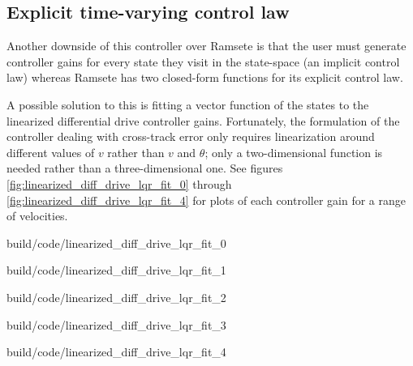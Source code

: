 \subsection{Explicit time-varying control law}

Another downside of this controller over Ramsete is that the user must generate
controller gains for every state they visit in the state-space (an implicit
control law) whereas Ramsete has two closed-form functions for its explicit
control law.

A possible solution to this is fitting a vector function of the states to the
linearized differential drive controller gains. Fortunately, the formulation of
the controller dealing with cross-track error only requires linearization around
different values of $v$ rather than $v$ and $\theta$; only a two-dimensional
function is needed rather than a three-dimensional one. See figures
\ref{fig:linearized_diff_drive_lqr_fit_0} through
\ref{fig:linearized_diff_drive_lqr_fit_4} for plots of each controller gain for
a range of velocities.

\begin{bookfigure}
  \begin{minisvg}{build/code/linearized_diff_drive_lqr_fit_0}
    \caption{Linearized differential drive controller LQR gain regression fit
      ($x$)}
    \label{fig:linearized_diff_drive_lqr_fit_0}
  \end{minisvg}
  \hfill
  \begin{minisvg}{build/code/linearized_diff_drive_lqr_fit_1}
    \caption{Linearized differential drive controller LQR gain fit regression
      fit ($y$)}
    \label{fig:linearized_diff_drive_lqr_fit_1}
  \end{minisvg}
  \hfill
  \begin{minisvg}{build/code/linearized_diff_drive_lqr_fit_2}
    \caption{Linearized differential drive controller LQR gain regression fit
      ($\theta$)}
    \label{fig:linearized_diff_drive_lqr_fit_2}
  \end{minisvg}
  \hfill
  \begin{minisvg}{build/code/linearized_diff_drive_lqr_fit_3}
    \caption{Linearized differential drive controller LQR gain regression fit
      ($v_l$)}
    \label{fig:linearized_diff_drive_lqr_fit_3}
  \end{minisvg}
  \hfill
  \begin{minisvg}{build/code/linearized_diff_drive_lqr_fit_4}
    \caption{Linearized differential drive controller LQR gain regression fit
      ($v_r$)}
    \label{fig:linearized_diff_drive_lqr_fit_4}
  \end{minisvg}
\end{bookfigure}

